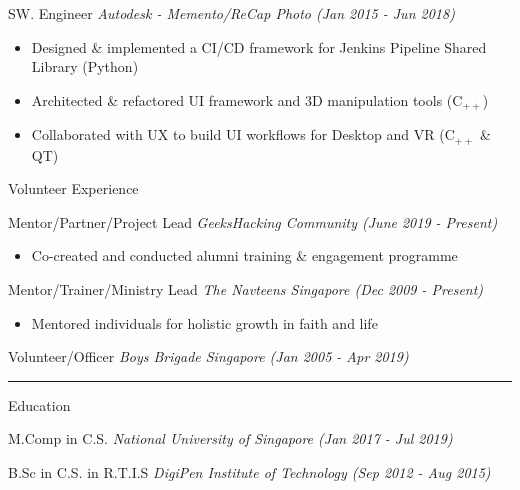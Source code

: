 \documentclass[letterpaper,11pt]{article}
\newcommand{\cvtitle}[1]{\Large\raggedright \textcolor{section_color}{#1}\\}
\newcommand{\cvhead}[1]{\large\raggedright \textcolor{subsection_color}{#1}\\}
\newcommand{\cvlist}[1]{\vspace{-12pt}\small \textcolor{item_color}{\begin{itemize}#1\end{itemize}}}
\newcommand{\cvli}[1]{\vspace{-4pt} \item{#1}}
\newcommand{\cvline}[0]{\noindent\rule{19cm}{0.4pt}}
\newcommand{\qualifier}[1]{\hfill \textsl{\footnotesize #1}}
\begin{document}
\cvhead{SW. Engineer \qualifier{Autodesk - Memento/ReCap Photo (Jan 2015 - Jun 2018)}}
\cvlist{
    \cvli{Designed \& implemented a CI/CD framework for Jenkins Pipeline Shared Library (Python)}
    \cvli{Architected \& refactored UI framework and 3D manipulation tools (C$_{++}$)}
    \cvli{Collaborated with UX to build UI workflows for Desktop and VR (C$_{++}$ \& QT)}
}

\cvtitle{Volunteer Experience}

\cvhead{Mentor/Partner/Project Lead \qualifier{GeeksHacking Community (June 2019 - Present)}}
\cvlist{
    \cvli{Co-created and conducted alumni training \& engagement programme}
}

\cvhead{Mentor/Trainer/Ministry Lead \qualifier{The Navteens Singapore (Dec 2009 - Present)}}
\cvlist{
    \cvli{Mentored individuals for holistic growth in faith and life}
}

\cvhead{Volunteer/Officer \qualifier{Boys Brigade Singapore (Jan 2005 - Apr 2019)}}

\cvline

\cvtitle{Education}

\cvhead{M.Comp in C.S. \qualifier{National University of Singapore (Jan 2017 - Jul 2019)}}

\cvhead{B.Sc in C.S. in R.T.I.S \qualifier{DigiPen Institute of Technology (Sep 2012 - Aug 2015)}}
\end{document}
